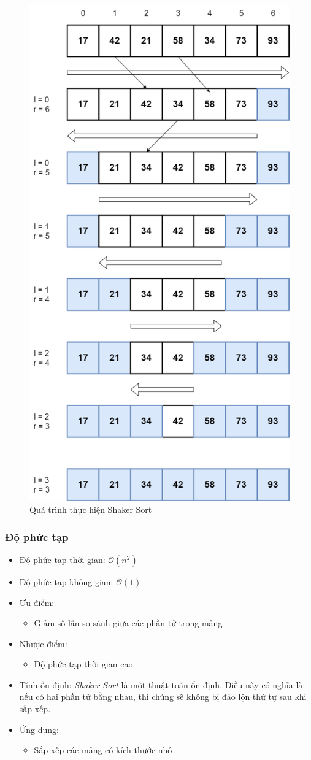 \begin{figure}[H]
    \centering
    \includegraphics[width=0.6\linewidth]{img/shaker_sort/1.png}
    \caption{Quá trình thực hiện Shaker Sort}
\end{figure}

\subsubsection{Độ phức tạp}

\begin{itemize}
    \item Độ phức tạp thời gian: $\mathcal{O}(n^2)$
    \item Độ phức tạp không gian: $\mathcal{O}(1)$
    \item Ưu điểm:
        \begin{itemize}
            \item Giảm số lần so sánh giữa các phần tử trong mảng
        \end{itemize}
    \item Nhược điểm:
        \begin{itemize}
            \item Độ phức tạp thời gian cao
        \end{itemize}
    \item Tính ổn định: \textit{Shaker Sort} là một thuật toán ổn định. Điều này có nghĩa là nếu có hai phần tử bằng nhau, thì chúng sẽ không bị đảo lộn thứ tự sau khi sắp xếp.
    \item Ứng dụng:
        \begin{itemize}
            \item Sắp xếp các mảng có kích thước nhỏ
        \end{itemize}
\end{itemize}
